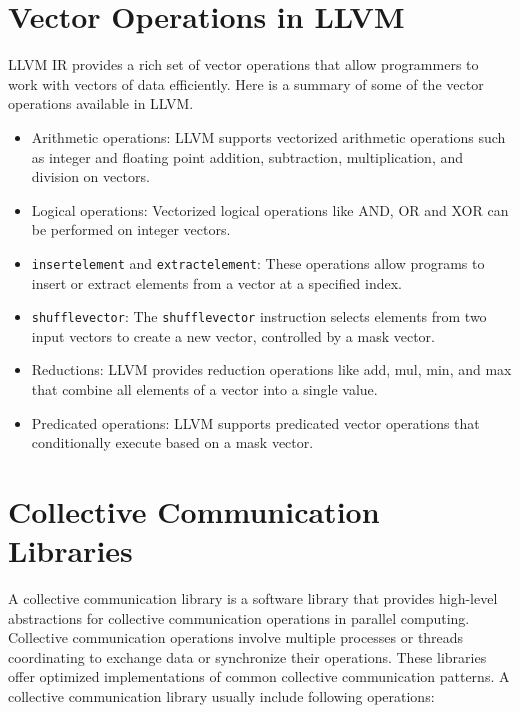 \section {Vector Operations in LLVM}
\label{sec:llvm-vector-ops}

LLVM IR provides a rich set of vector operations that allow
programmers to work with vectors of data efficiently. Here is a
summary of some of the vector operations available in LLVM.

\begin{itemize}
  \item Arithmetic operations: LLVM supports vectorized arithmetic
  operations such as integer and floating point addition, subtraction,
  multiplication, and division on vectors.
  \item Logical operations: Vectorized logical operations like AND, OR
  and XOR can be performed on integer vectors.
  \item \texttt{insertelement} and \texttt{extractelement}: These
  operations allow programs to insert or extract elements from a
  vector at a specified index.
  \item \texttt{shufflevector}: The \texttt{shufflevector} instruction
  selects elements from two input vectors to create a new vector,
  controlled by a mask vector.
  \item Reductions: LLVM provides reduction operations like add, mul,
  min, and max that combine all elements of a vector into a single
  value.
  \item Predicated operations: LLVM supports predicated vector
  operations that conditionally execute based on a mask vector.
\end{itemize}


\section {Collective Communication Libraries}

A collective communication library is a software library that provides
high-level abstractions for collective communication operations in
parallel computing. Collective communication operations involve
multiple processes or threads coordinating to exchange data or
synchronize their operations. These libraries offer optimized
implementations of common collective communication patterns.
A collective communication library usually include following operations:

